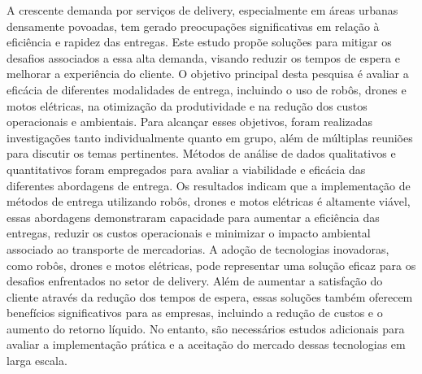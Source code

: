 
\centeredchapterstyle
\begin{resumo}
    \noindent\textbf{}A crescente demanda por serviços de delivery, especialmente em áreas urbanas densamente povoadas, tem gerado preocupações significativas em relação à eficiência e rapidez das entregas. Este estudo propõe soluções para mitigar os desafios associados a essa alta demanda, visando reduzir os tempos de espera e melhorar a experiência do cliente. O objetivo principal desta pesquisa é avaliar a eficácia de diferentes modalidades de entrega, incluindo o uso de robôs, drones e motos elétricas, na otimização da produtividade e na redução dos custos operacionais e ambientais. Para alcançar esses objetivos, foram realizadas investigações tanto individualmente quanto em grupo, além de múltiplas reuniões para discutir os temas pertinentes. Métodos de análise de dados qualitativos e quantitativos foram empregados para avaliar a viabilidade e eficácia das diferentes abordagens de entrega. Os resultados indicam que a implementação de métodos de entrega utilizando robôs, drones e motos elétricas é altamente viável, essas abordagens demonstraram capacidade para aumentar a eficiência das entregas, reduzir os custos operacionais e minimizar o impacto ambiental associado ao transporte de mercadorias. A adoção de tecnologias inovadoras, como robôs, drones e motos elétricas, pode representar uma solução eficaz para os desafios enfrentados no setor de delivery. Além de aumentar a satisfação do cliente através da redução dos tempos de espera, essas soluções também oferecem benefícios significativos para as empresas, incluindo a redução de custos e o aumento do retorno líquido. No entanto, são necessários estudos adicionais para avaliar a implementação prática e a aceitação do mercado dessas tecnologias em larga escala.
\end{resumo}
